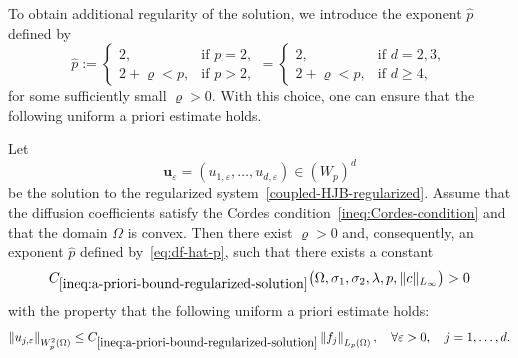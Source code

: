 \documentclass[final,onefignum,onetabnum]{mousaviart}
\begin{document}
	To obtain additional regularity of the solution, 
	we introduce the exponent $\hat{p}$ defined by
	\begin{equation}
	\label{eq:df-hat-p}
	\hat{p} :=
	\begin{cases}
		2, & \text{if } p = 2, 
		\\
		2 + \varrho < p, & \text{if } p > 2,
	\end{cases}
	=
	\begin{cases}
		2, & \text{if } d = 2,3, 
		\\
		2 + \varrho < p, & \text{if } d \geq 4,
	\end{cases}
	\end{equation}
	for some sufficiently small $\varrho>0$. With this choice, one can ensure that the following uniform a priori estimate holds.
	\begin{lemma}
	\label{lem:a-priori-estimate-regularized-system}
	Let
	\[
	\boldsymbol{u}_{\varepsilon} = (u_{1,\varepsilon}, \dots, u_{d,\varepsilon}) \in (W_p)^d
	\]
	be the solution to the regularized system~\eqref{coupled-HJB-regularized}. 
	Assume that the diffusion coefficients satisfy the Cordes condition~\eqref{ineq:Cordes-condition} and that the domain $\Omega$ is convex. 
	Then there exist $\varrho>0$ and, consequently, an exponent $\hat p$ defined by~\eqref{eq:df-hat-p}, such that there exists a constant
	\[
	C_{\ref{ineq:a-priori-bound-regularized-solution}}
	\bigl(\Omega,\sigma_1,\sigma_2,\lambda,p,\|c\|_{L_\infty}\bigr)
	>0
	\]
	with the property that the following uniform a priori estimate holds:
	\begin{equation}
		\label{ineq:a-priori-bound-regularized-solution}
		\left\| u_{j,\varepsilon} \right\|_{W^{2}_{\hat{p}}(\Omega)}
		\le 
		C_{\ref{ineq:a-priori-bound-regularized-solution}}
		\left\| f_j \right\|_{L_{p}(\Omega)},
		\quad \forall \varepsilon > 0,\quad j = 1,\dots,d.
	\end{equation}
	\end{lemma}
	
\end{document}
